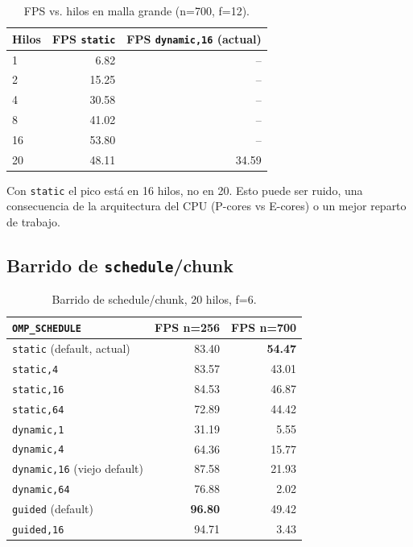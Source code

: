 \documentclass[11pt]{article}
\begin{document}
\begin{table}[ht]
\centering
\begin{tabular}{lrr}
\toprule
Hilos & FPS \texttt{static} & FPS \texttt{dynamic,16} (actual) \\
\midrule
1  & 6.82  & -- \\
2  & 15.25 & -- \\
4  & 30.58 & -- \\
8  & 41.02 & -- \\
16 & 53.80 & -- \\
20 & 48.11 & 34.59 \\
\bottomrule
\end{tabular}
\caption{FPS vs. hilos en malla grande (n=700, f=12).}
\label{tab:threads-700}
\end{table}

Con \texttt{static} el pico está en 16 hilos, no en 20. Esto puede ser ruido, una consecuencia
de la arquitectura del CPU (P-cores vs E-cores) o un mejor reparto de trabajo. 

\subsection{Barrido de \texttt{schedule}/chunk}

\begin{table}[ht]
\centering
\begin{tabular}{lrr}
\toprule
\texttt{OMP\_SCHEDULE} & FPS n=256 & FPS n=700 \\
\midrule
\texttt{static} (default, actual)  & 83.40 & \textbf{54.47} \\
\texttt{static,4}                  & 83.57 & 43.01 \\
\texttt{static,16}                 & 84.53 & 46.87 \\
\texttt{static,64}                 & 72.89 & 44.42 \\
\texttt{dynamic,1}                 & 31.19 & 5.55  \\
\texttt{dynamic,4}                 & 64.36 & 15.77 \\
\texttt{dynamic,16} (viejo default) & 87.58 & 21.93 \\
\texttt{dynamic,64}                & 76.88 & 2.02  \\
\texttt{guided} (default)          & \textbf{96.80} & 49.42 \\
\texttt{guided,16}                 & 94.71 & 3.43  \\
\bottomrule
\end{tabular}
\caption{Barrido de schedule/chunk, 20 hilos, f=6.}
\label{tab:schedule-sweep}
\end{table}
\end{document}
